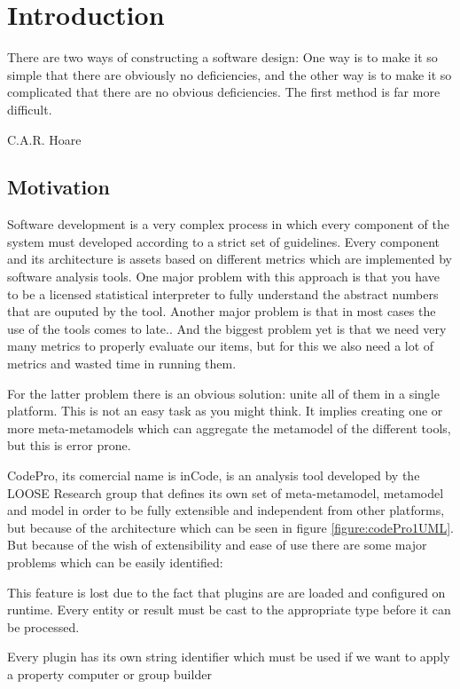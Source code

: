 \chapter{Introduction}\label{ch:1}

\epigraph{There are two ways of constructing a software design: 
One way is to make it so simple that there are obviously no deficiencies, and the other way is to make it so complicated that there are no obvious deficiencies. 
The first method is far more difficult.}{C.A.R. Hoare}

\section{Motivation}
	Software development is a very complex process in which every component of the
system must developed according to a strict set of guidelines. Every component
and its architecture is assets based on different metrics which are implemented
by software analysis tools. One major problem with this approach is that you
have to be a licensed statistical interpreter to fully understand the abstract
numbers that are ouputed by the tool. Another major problem is that in most
cases the use of the tools comes to late.\cite{tools:inCode}. And the biggest
problem yet is that we need very many metrics to properly evaluate our items,
but for this we also need a lot of metrics and wasted time in running them.

	For the latter problem there is an obvious solution: unite all of them
in a single platform. This is not an easy task as you might think. It implies
creating one or more meta-metamodels which can aggregate the metamodel of the
different tools, but this is error prone.

	CodePro, its comercial name is inCode\cite{site:inCode}, is an analysis tool
developed by the LOOSE Research group \cite{tools:inCode} that defines its own 
set of meta-metamodel, metamodel and model in order to be fully extensible and
independent from other platforms, but because of the architecture which can be 
seen in figure \ref{figure:codePro1UML}. But because of the wish of
extensibility and ease of use there are some major problems which can be easily
identified:
		\begin{description}[labelindent=2cm]
			\item[type safety] This feature is lost due to the fact that plugins are
are loaded and configured on runtime. Every entity or result must be cast to the
appropriate type before it can be processed. 
			\item[magic identifiers] Every plugin has its own string identifier which 
must be used if we want to apply a property computer or group builder  
		\end{description}
	
